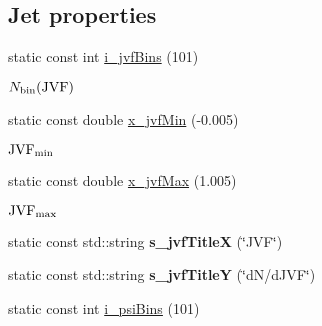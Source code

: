\subsection*{Jet properties}
\begin{CompactItemize}
\item 
\hypertarget{namespaceHistGroupCfg_87488156852926b132d1225bb5746df7}{
static const int \hyperlink{namespaceHistGroupCfg_87488156852926b132d1225bb5746df7}{i\_\-jvf\-Bins} (101)}
\label{namespaceHistGroupCfg_87488156852926b132d1225bb5746df7}

\begin{CompactList}\small\item\em $N_{\rm bin}({\rm JVF})$ \item\end{CompactList}\item 
\hypertarget{namespaceHistGroupCfg_140b9a05da00ac7a7864d4b44c2bde2c}{
static const double \hyperlink{namespaceHistGroupCfg_140b9a05da00ac7a7864d4b44c2bde2c}{x\_\-jvf\-Min} (-0.005)}
\label{namespaceHistGroupCfg_140b9a05da00ac7a7864d4b44c2bde2c}

\begin{CompactList}\small\item\em ${\rm JVF}_{\rm min}$ \item\end{CompactList}\item 
\hypertarget{namespaceHistGroupCfg_ccc01d0520d86eaf7a5582cd4973c17d}{
static const double \hyperlink{namespaceHistGroupCfg_ccc01d0520d86eaf7a5582cd4973c17d}{x\_\-jvf\-Max} (1.005)}
\label{namespaceHistGroupCfg_ccc01d0520d86eaf7a5582cd4973c17d}

\begin{CompactList}\small\item\em ${\rm JVF}_{\rm max}$ \item\end{CompactList}\item 
\hypertarget{namespaceHistGroupCfg_6566107e13234adca149ed8202feb1fe}{
static const std::string \textbf{s\_\-jvf\-Title\-X} (\char`\"{}JVF\char`\"{})}
\label{namespaceHistGroupCfg_6566107e13234adca149ed8202feb1fe}

\item 
\hypertarget{namespaceHistGroupCfg_adc72dd9574c2c0d1d05c3bb3a85ce54}{
static const std::string \textbf{s\_\-jvf\-Title\-Y} (\char`\"{}d\-N/d\-JVF\char`\"{})}
\label{namespaceHistGroupCfg_adc72dd9574c2c0d1d05c3bb3a85ce54}

\item 
\hypertarget{namespaceHistGroupCfg_a65ba9dd78618542f0a0c46c95747064}{
static const int \hyperlink{namespaceHistGroupCfg_a65ba9dd78618542f0a0c46c95747064}{i\_\-psi\-Bins} (101)}
\label{namespaceHistGroupCfg_a65ba9dd78618542f0a0c46c95747064}


\end{CompactItemize}
